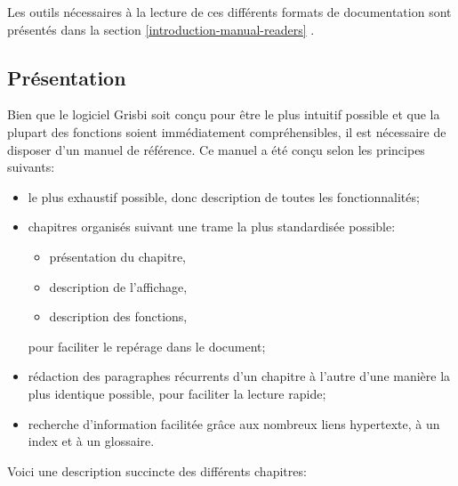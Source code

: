 Les outils nécessaires à la lecture de ces différents formats de documentation sont présentés dans la section \vref{introduction-manual-readers} .


\subsection{Présentation\label{introduction-manual-presentation}}

Bien que le logiciel Grisbi soit conçu pour être le plus intuitif possible et que la plupart des fonctions soient immédiatement compréhensibles, il est nécessaire de disposer d'un manuel de référence. Ce manuel a été conçu selon les principes suivants:

\begin{itemize} 
	\item le plus exhaustif possible, donc description de toutes les fonctionnalités;
	\item chapitres organisés suivant une trame la plus standardisée possible:
		\begin{itemize}
		\item présentation du chapitre,
		\item description de l'affichage,
		\item description des fonctions,
		\end{itemize}
	pour faciliter le repérage dans le document;
	\item rédaction des paragraphes récurrents d'un chapitre à l'autre d'une manière la plus identique possible, pour faciliter la lecture rapide;
	\item recherche d'information facilitée grâce aux nombreux \gls{liens hypertexte}, à un index et à un glossaire.
\end{itemize}

Voici une description succincte des différents chapitres:

